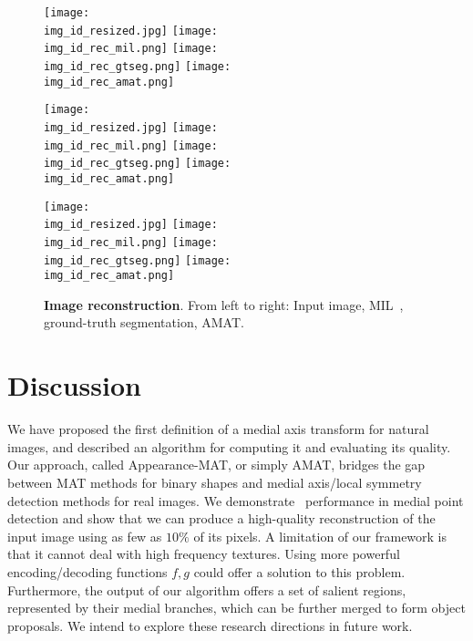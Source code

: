 \documentclass[10pt,twocolumn,letterpaper]{article}
\begin{document}
\begin{figure*}[t]
\centering
\def\imgw{0.24}

\def\img_id{145086}
\texttt{[image: \\img\_id\_resized.jpg]}
\texttt{[image: \\img\_id\_rec\_mil.png]}
\texttt{[image: \\img\_id\_rec\_gtseg.png]}
\texttt{[image: \\img\_id\_rec\_amat.png]}

\def\img_id{85048}
\texttt{[image: \\img\_id\_resized.jpg]}
\texttt{[image: \\img\_id\_rec\_mil.png]}
\texttt{[image: \\img\_id\_rec\_gtseg.png]}
\texttt{[image: \\img\_id\_rec\_amat.png]}

\def\img_id{42049}
\texttt{[image: \\img\_id\_resized.jpg]}
\texttt{[image: \\img\_id\_rec\_mil.png]}
\texttt{[image: \\img\_id\_rec\_gtseg.png]}
\texttt{[image: \\img\_id\_rec\_amat.png]}

\caption{\textbf{Image reconstruction}. From left to right: Input image, MIL~\cite{tsogkas2012learning}, ground-truth segmentation, AMAT.}
\label{fig:experiments:reconstruction}
\end{figure*}



\section{Discussion}\label{sec:discussion}
We have proposed the first definition of a medial axis transform for natural images, and described an algorithm for
computing it and evaluating its quality.
Our approach, called Appearance-MAT, or simply AMAT, bridges the gap between MAT methods for binary shapes and 
medial axis/local symmetry detection methods for real images.
We demonstrate \sota\ performance in medial point detection and show that we can produce a high-quality 
reconstruction of the input image using as few as $10\%$ of its pixels. 
A limitation of our framework is that it cannot deal with high frequency textures.
Using more powerful encoding/decoding functions $f,g$ could offer a solution to this problem.
Furthermore, the output of our algorithm offers a set of salient regions, represented by 
their medial branches, which can be further merged to form object proposals.
We intend to explore these research directions in future work.


{\small


}
\end{document}
